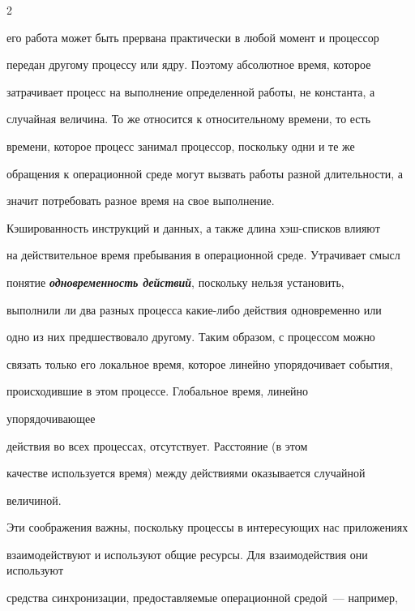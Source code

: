 \begin{multicols}{2}
{его работа может быть прервана практически в любой момент и процессор

передан другому процессу или ядру. Поэтому абсолютное время, которое

затрачивает процесс на выполнение определенной работы, не  константа, а

случайная  величина. То же  относится к относительному времени, то есть

времени, которое процесс занимал процессор,  поскольку одни и те же

обращения к операционной среде могут вызвать работы разной длительности, а

значит потребовать разное время на свое выполнение.

{ %



}



Кэшированность инструкций и данных, а также длина хэш-списков влияют

на действительное время пребывания в операционной  среде. Утрачивает смысл

понятие {\bfseries\textit{одно\-вре\-мен\-ность действий}}, поскольку  нельзя установить,

выполнили ли два разных процесса какие-либо действия одновременно или

одно из них предшествовало другому. Таким образом, с процессом можно

связать только его локальное время, которое линейно упорядочивает события,

происходившие в этом процессе.  Глобальное время, линейно

упо\-ря\-до\-чи\-ва\-ющее

 действия во всех процессах, отсутствует. Расстояние (в этом

качестве используется время) между действиями оказывается случайной

величиной.

{ %



}



Эти соображения важны, поскольку процессы в интересующих нас приложениях 

взаимодействуют и используют общие ресурсы. Для взаимодействия они используют 

средства синхронизации, предоставляемые операционной средой~--- например, 

}
\end{multicols}
